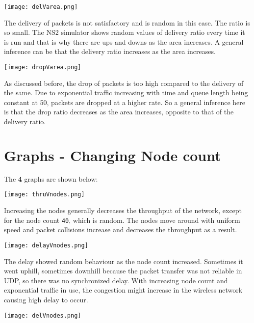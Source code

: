 \documentclass{article}
\begin{document}
\begin{center}
    \texttt{[image: delVarea.png]}
\end{center}

The delivery of packets is not satisfactory and is random in this case. The ratio is so small. The NS2 simulator shows random values of delivery ratio every time it is run and that is why there are ups and downs as the area increases. A general inference can be that the delivery ratio increases as the area increases.

\begin{center}
    \texttt{[image: dropVarea.png]}
\end{center}

As discussed before, the drop of packets is too high compared to the delivery of the same. Due to exponential traffic increasing with time and queue length being constant at 50, packets are dropped at a higher rate. So a general inference here is that the drop ratio decreases as the area increases, opposite to that of the delivery ratio.

\section{Graphs - Changing Node count}
The \textbf{4} graphs are shown below:

\begin{center}
    \texttt{[image: thruVnodes.png]}
\end{center}

Increasing the nodes generally decreases the throughput of the network, except for the node count \texttt{40}, which is random. The nodes move around with uniform speed and packet collisions increase and decreases the throughput as a result.

\begin{center}
    \texttt{[image: delayVnodes.png]}
\end{center}

The delay showed random behaviour as the node count increased. Sometimes it went uphill, sometimes downhill because the packet transfer was not reliable in UDP, so there was no synchronized delay. With increasing node count and exponential traffic in use, the congestion might increase in the wireless network causing high delay to occur.

\begin{center}
    \texttt{[image: delVnodes.png]}
\end{center}
\end{document}
